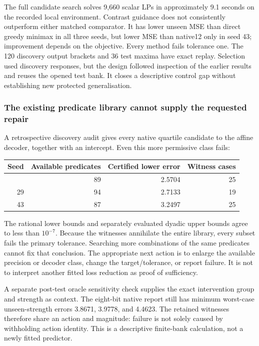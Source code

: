 \documentclass[
  british,
  11pt,
  a4paper,
]{article}
\newcounter{none} %
\begin{document}
The full candidate search solves 9,660 scalar LPs in approximately 9.1
seconds on the recorded local environment. Contrast guidance does not
consistently outperform either matched comparator. It has lower unseen
MSE than direct greedy minimax in all three seeds, but lower MSE than
native12 only in seed 43; improvement depends on the objective. Every
method fails tolerance one. The 120 discovery output brackets and 36
test maxima have exact replay. Selection used discovery responses, but
the design followed inspection of the earlier results and reuses the
opened test bank. It closes a descriptive control gap without
establishing new protected generalisation.

\subsubsection{The existing predicate library cannot supply the
requested
repair}\label{the-existing-predicate-library-cannot-supply-the-requested-repair}

A retrospective discovery audit gives every native quartile candidate to
the affine decoder, together with an intercept. Even this more
permissive class fails:

{\def\LTcaptype{none} %
\begin{longtable}[]{@{}rrrr@{}}
\toprule\noalign{}
Seed & Available predicates & Certified lower error & Witness cases \\
\midrule\noalign{}
\endhead
\bottomrule\noalign{}
\endlastfoot
17 & 89 & 2.5704 & 25 \\
29 & 94 & 2.7133 & 19 \\
43 & 87 & 3.2497 & 25 \\
\end{longtable}
}

The rational lower bounds and separately evaluated dyadic upper bounds
agree to less than \(10^{-7}\). Because the witnesses annihilate the
entire library, every subset fails the primary tolerance. Searching more
combinations of the same predicates cannot fix that conclusion. The
appropriate next action is to enlarge the available precision or decoder
class, change the target/tolerance, or report failure. It is not to
interpret another fitted loss reduction as proof of sufficiency.

A separate post-test oracle sensitivity check supplies the exact
intervention group and strength as context. The eight-bit native report
still has minimum worst-case unseen-strength errors 3.8671, 3.9778, and
4.4623. The retained witnesses therefore share an action and magnitude:
failure is not solely caused by withholding action identity. This is a
descriptive finite-bank calculation, not a newly fitted predictor.
\end{document}
